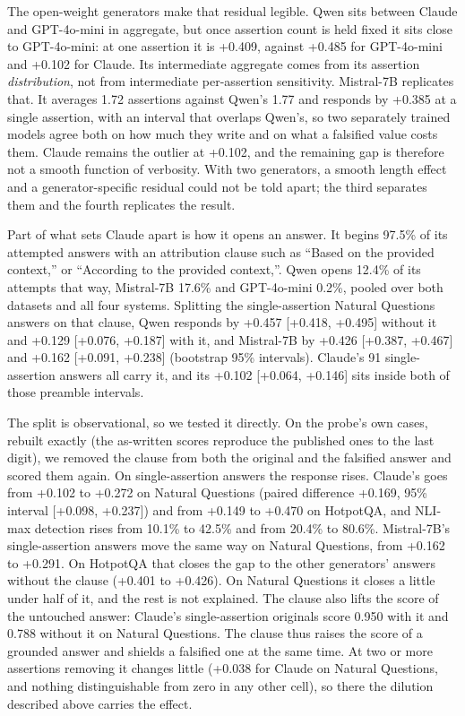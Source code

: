 \documentclass[11pt]{article}
\begin{document}
The open-weight generators make that residual legible. Qwen sits between Claude and GPT-4o-mini in aggregate, but once assertion count is held fixed it sits close to GPT-4o-mini: at one assertion it is +0.409, against +0.485 for GPT-4o-mini and +0.102 for Claude. Its intermediate aggregate comes from its assertion \emph{distribution}, not from intermediate per-assertion sensitivity. Mistral-7B replicates that. It averages 1.72 assertions against Qwen's 1.77 and responds by +0.385 at a single assertion, with an interval that overlaps Qwen's, so two separately trained models agree both on how much they write and on what a falsified value costs them. Claude remains the outlier at +0.102, and the remaining gap is therefore not a smooth function of verbosity. With two generators, a smooth length effect and a generator-specific residual could not be told apart; the third separates them and the fourth replicates the result.

Part of what sets Claude apart is how it opens an answer. It begins 97.5\% of its attempted answers with an attribution clause such as ``Based on the provided context,'' or ``According to the provided context,''. Qwen opens 12.4\% of its attempts that way, Mistral-7B 17.6\% and GPT-4o-mini 0.2\%, pooled over both datasets and all four systems. Splitting the single-assertion Natural Questions answers on that clause, Qwen responds by +0.457 [+0.418, +0.495] without it and +0.129 [+0.076, +0.187] with it, and Mistral-7B by +0.426 [+0.387, +0.467] and +0.162 [+0.091, +0.238] (bootstrap 95\% intervals). Claude's 91 single-assertion answers all carry it, and its +0.102 [+0.064, +0.146] sits inside both of those preamble intervals.

The split is observational, so we tested it directly. On the probe's own cases, rebuilt exactly (the as-written scores reproduce the published ones to the last digit), we removed the clause from both the original and the falsified answer and scored them again. On single-assertion answers the response rises. Claude's goes from +0.102 to +0.272 on Natural Questions (paired difference +0.169, 95\% interval [+0.098, +0.237]) and from +0.149 to +0.470 on HotpotQA, and NLI-max detection rises from 10.1\% to 42.5\% and from 20.4\% to 80.6\%. Mistral-7B's single-assertion answers move the same way on Natural Questions, from +0.162 to +0.291. On HotpotQA that closes the gap to the other generators' answers without the clause (+0.401 to +0.426). On Natural Questions it closes a little under half of it, and the rest is not explained. The clause also lifts the score of the untouched answer: Claude's single-assertion originals score 0.950 with it and 0.788 without it on Natural Questions. The clause thus raises the score of a grounded answer and shields a falsified one at the same time. At two or more assertions removing it changes little (+0.038 for Claude on Natural Questions, and nothing distinguishable from zero in any other cell), so there the dilution described above carries the effect.
\end{document}
